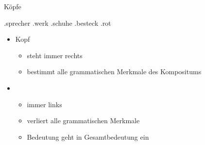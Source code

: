 \begin{frame}
  {Köpfe}
  \begin{exe}
    \ex
    \begin{xlist}
      \ex {}.\alert<10->{sprecher} 
      \ex {}.\alert<11->{werk} 
      \ex {}.\alert<12->{schuhe} 
      \ex {}.\alert<13->{besteck} 
      \ex {}.\alert<14->{rot} 
    \end{xlist}
  \end{exe}
  \begin{itemize}
    \item \alert{Kopf}
      \begin{itemize}
        \item steht immer rechts
        \item bestimmt alle grammatischen Merkmale des Kompositums
      \end{itemize}
      \Halbzeile
    \item {}
      \begin{itemize}
        \item immer links
        \item verliert alle grammatischen Merkmale
        \item Bedeutung geht in Gesamtbedeutung ein
      \end{itemize}
  \end{itemize}
\end{frame}

